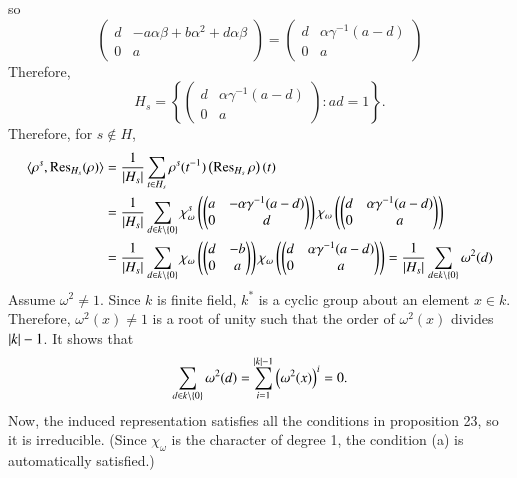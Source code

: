\documentclass[a4paper, 12pt]{article}
\theoremstyle{Mydefinition}
\theoremstyle{Mytheorem}
\begin{document}
so
\begin{equation}
    \begin{pmatrix}
    d & -a\alpha\beta + b\alpha^2+d\alpha\beta\\
    0 & a
    \end{pmatrix} = \begin{pmatrix}
    d & \alpha\gamma^{-1}(a-d)\\
    0 & a
    \end{pmatrix}
\end{equation}
Therefore, 
\begin{equation}
    H_s = \left\{\begin{pmatrix}
    d & \alpha\gamma^{-1}(a-d) \\ 0 & a
    \end{pmatrix}:ad=1\right\}.
\end{equation}
Therefore, for $s\not\in H$,
\begin{equation}
\begin{split}
    \langle \rho^s, \Res_{H_s}(\rho) \rangle &= \frac{1}{\abs{H_s}}\sum_{t\in H_s}\rho^s(t^{-1})\left(\Res_{H_s}\rho\right)(t) \\
    &=\frac{1}{\abs{H_s}}\sum_{d\in k\setminus\{0\}}\chi_\omega^s\left(\begin{pmatrix}
    a & -\alpha\gamma^{-1}(a-d)\\ 0 & d
    \end{pmatrix}\right)\chi_\omega\left(\begin{pmatrix}
    d & \alpha\gamma^{-1}(a-d) \\ 0 & a
    \end{pmatrix}\right)\\
    &=\frac{1}{\abs{H_s}}\sum_{d\in k\setminus\{0\}}\chi_\omega\left(\begin{pmatrix}
    d & -b\\ 0 & a
    \end{pmatrix}\right)\chi_\omega\left(\begin{pmatrix}
    d & \alpha\gamma^{-1}(a-d) \\ 0 & a
    \end{pmatrix}\right) = \frac{1}{\abs{H_s}}\sum_{d\in k\setminus\{0\}}\omega^2(d)
\end{split} 
\end{equation}
Assume $\omega^2\neq 1$. Since $k$ is finite field, $k^*$ is a cyclic group about an element $x\in k$. Therefore, $\omega^2(x)\neq 1$ is a root of unity such that the order of $\omega^2(x)$ divides $\abs{k}-1$. It shows that
\begin{equation}
    \sum_{d\in k\setminus\{0\}}\omega^2(d) = \sum_{i=1}^{\abs{k}-1}\left(\omega^2(x)\right)^i = 0.
\end{equation}
Now, the induced representation satisfies all the conditions in proposition 23, so it is irreducible. (Since $\chi_\omega$ is the character of degree 1, the condition (a) is automatically satisfied.)
\end{document}
